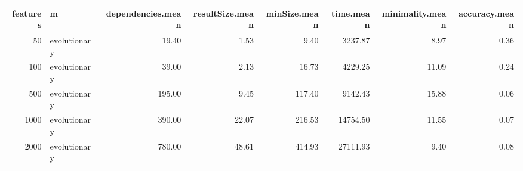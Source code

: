 \begin{table}[ht]
\centering
\begin{tabular}{rlrrrrrr}
  \hline
features & m & dependencies.mean & resultSize.mean & minSize.mean & time.mean & minimality.mean & accuracy.mean \\ 
  \hline
 50 & evolutionary & 19.40 & 1.53 & 9.40 & 3237.87 & 8.97 & 0.36 \\ 
  100 & evolutionary & 39.00 & 2.13 & 16.73 & 4229.25 & 11.09 & 0.24 \\ 
  500 & evolutionary & 195.00 & 9.45 & 117.40 & 9142.43 & 15.88 & 0.06 \\ 
  1000 & evolutionary & 390.00 & 22.07 & 216.53 & 14754.50 & 11.55 & 0.07 \\ 
  2000 & evolutionary & 780.00 & 48.61 & 414.93 & 27111.93 & 9.40 & 0.08 \\ 
   \hline
\end{tabular}
\end{table}
